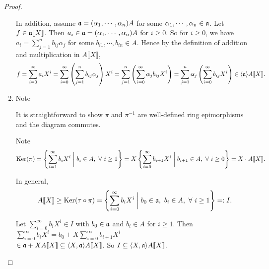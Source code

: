\begin{proof}
\begin{enumerate}
            In addition, assume $\mathfrak{a} = (\alpha_1,\cdots,\alpha_n)A$ for some $\alpha_1,\cdots,\alpha_n \in \mathfrak{a}$. Let $f \in \mathfrak{a} \llbracket X \rrbracket$. Then $a_i \in \mathfrak{a} = (\alpha_1,\cdots,\alpha_n)A$ for $i \geq 0$. So for $i \geq 0$, we have $a_i = \sum_{j=1}^n b_{ij}\alpha_j$ for some $b_{i1},\cdots,b_{in} \in A$. Hence by the definition of addition and multiplication in $A\llbracket X \rrbracket$, 
            \[f = \sum_{i=0}^\infty a_iX^i = \sum_{i=0}^\infty \left(\sum_{j=1}^n b_{ij}\alpha_j\right)X^i = \sum_{j=1}^n \left(\sum_{i=0}^\infty \alpha_jb_{ij}X^i\right) = \sum_{j=1}^n \alpha_j \left(\sum_{i=0}^\infty b_{ij}X^i\right) \in \langle \mathfrak{a} \rangle A\llbracket X \rrbracket.\]
        \item 
            Note
            \begin{center}
            \end{center}
            \par It is straightforward to show $\pi$ and $\pi^{-1}$ are well-defined ring epimorphisms and the diagram commutes. \par 
            Note 
            \[\operatorname{Ker}(\pi) = \left\{\sum_{i=1}^\infty b_iX^i \mathrel{\bigg |} b_i \in A, \ \forall \  i \geq 1\right\} = X\left\{\sum_{i=0}^\infty b_{i+1}X^i \mathrel{\bigg |} b_{i+1} \in A, \ \forall \  i \geq 0\right\} = X \cdot A \llbracket X \rrbracket.\]
            \par In general, 
            \[A\llbracket X \rrbracket \geq \operatorname{Ker}(\tau \circ \pi) = \left\{\sum_{i=0}^\infty b_iX^i \mathrel{\bigg |} b_0 \in \mathfrak{a},\ b_i \in A, \ \forall \  i \geq 1\right\} =: I.\]
            \par Let $\sum_{i=0}^\infty b_i X^i \in I$ with $b_0 \in \mathfrak{a}$ and $b_i \in A$ for $i \geq 1$. Then $\sum_{i=0}^\infty b_iX^i = b_0 + X \sum_{i=0}^\infty b_{i+1}X^i$ \\
            $\in \mathfrak{a} + X A\llbracket X \rrbracket \subseteq \langle X,\mathfrak{a} \rangle A\llbracket X \rrbracket$. So $I \subseteq \langle X,\mathfrak{a} \rangle A\llbracket X \rrbracket$. \par 

\end{enumerate}
\end{proof}
